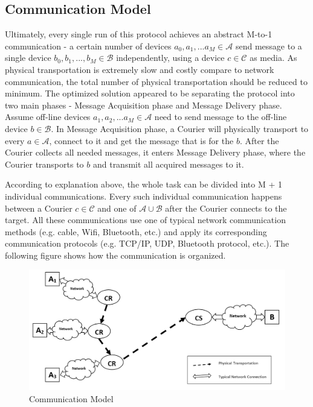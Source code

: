 \subsection{Communication Model}
Ultimately, every single run of this protocol achieves an abstract M-to-1 communication - a certain number of devices $a_0, a_1, ... a_M \in \mathcal{A}$ send message to a single device $b_0, b_1, ..., b_M \in \mathcal{B}$ independently, using a device $c \in \mathcal{C}$ as media. As physical transportation is extremely slow and costly compare to network communication, the total number of physical transportation should be reduced to minimum. The optimized solution appeared to be separating the protocol into two main phases - Message Acquisition phase and Message Delivery phase. Assume off-line devices $a_1, a_2, ... a_M \in \mathcal{A}$ need to send message to the off-line device $b \in \mathcal{B}$. In Message Acquisition phase, a Courier will physically transport to every $a \in \mathcal{A}$, connect to it and get the message that is for the $b$. After the Courier collects all needed messages, it enters Message Delivery phase, where the Courier transports to $b$ and transmit all acquired messages to it.

According to explanation above, the whole task can be divided into M + 1 individual communications. Every such individual communication happens between a Courier $c \in \mathcal{C}$ and one of $\mathcal{A} \cup \mathcal{B}$ after the Courier connects to the target. All these communications use one of typical network communication methods (e.g. cable, Wifi, Bluetooth, etc.) and apply its corresponding communication protocols (e.g. TCP/IP, UDP, Bluetooth protocol, etc.). The following figure shows how the communication is organized.

\begin{figure}[h!]
\includegraphics[width=\textwidth,natwidth=1123,natheight=530]{figures/communicationmodel.png}
\caption{Communication Model}
\end{figure}

